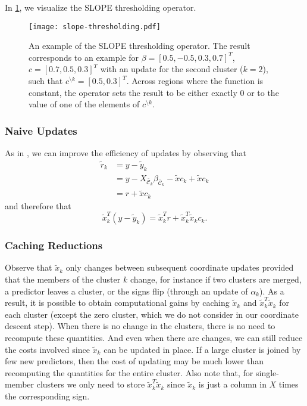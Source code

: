 
In \cref{fig:slope-thresholding}, we visualize the SLOPE thresholding operator.

\begin{figure}[htbp]
  \centering
  \texttt{[image: slope-thresholding.pdf]}
  \caption{%
  An example of the SLOPE thresholding operator. The result corresponds to an
  example for \(\beta = [0.5, -0.5, 0.3, 0.7]^T\), \(c = [0.7, 0.5, 0.3]^T\)
  with an update for the second cluster (\(k = 2\)), such that
  \(c^{\setminus k} = [0.5, 0.3]^T\). Across regions where the function is constant,
      the operator sets the result to be either exactly 0 or to the value of one
      of the elements of \(c^{\setminus k}\).
    }
  \label{fig:slope-thresholding}
\end{figure}

\subsubsection{Naive Updates}

As in \textcite{friedman2010}, we can improve the efficiency of updates by observing that
\begin{equation*}
  \begin{aligned}
    \tilde r_k & = y - \tilde y_k                                                                       \\
               & = y - X_{\bar{\mathcal{C}}_k}\beta_{\bar{\mathcal{C}}_k} - \tilde x c_k + \tilde x c_k \\
               & = r + \tilde x c_k
  \end{aligned}
\end{equation*}
and therefore that
\begin{equation}
  \label{eq:naive-update}
  \tilde x_k^T (y - \tilde y_k) = \tilde x_k^T r + \tilde x_k^T \tilde x_k c_k.
\end{equation}

\subsubsection{Caching Reductions}

Observe that \(\tilde x_k\) only changes between subsequent coordinate updates provided that the members of the cluster \(k\) change, for instance if two clusters are merged, a predictor leaves a cluster, or the signs flip (through an update of \(\alpha_k\)).
As a result, it is possible to obtain computational gains by caching \(\tilde x_k\) and \(\tilde x_k^T \tilde x_k\) for each cluster (except the zero cluster, which we do not consider in our coordinate descent step).
When there is no change in the clusters, there is no need to recompute these quantities.
And even when there are changes, we can still reduce the costs involved since \(\tilde x_k\) can be updated in place.
If a large cluster is joined by few new predictors, then the cost of updating may be much lower than recomputing the quantities for the entire cluster.
Also note that, for single-member clusters we only need to store \(\tilde x_k^T \tilde x_k\) since \(\tilde x_k\) is just a column in \(X\) times the corresponding sign.

